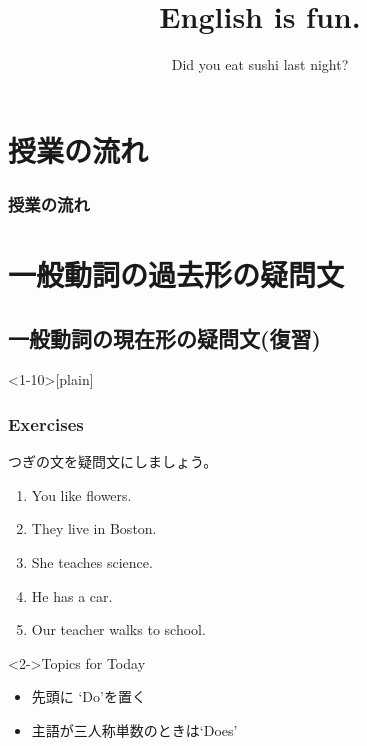 \documentclass[aspectratio=169,xcolor={dvipsnames,table}]{beamer}
\title{English is fun.}
\subtitle{Did you eat sushi last night?}
\author{}
\institute[]{}
\date[]
\newcommand{\myaudio}[1]{\href{#1}{\faVolumeUp}}
\begin{document}
\begin{frame}[plain]
  \titlepage
\end{frame}

\section*{授業の流れ}
\begin{frame}[plain]
  \frametitle{授業の流れ}
  \tableofcontents
\end{frame}

\section{一般動詞の過去形の疑問文}
\subsection{一般動詞の現在形の疑問文(復習)}
 
\begin{frame}<1-10>[plain]\frametitle{Exercises}

つぎの文を疑問文にしましょう。

 \begin{enumerate}
  \item<1-> You like flowers.\hspace{59.7pt}
  \item<1-> They live in Boston.\hspace{47.5pt}%
  \item<1-> She teaches science.\hspace{42pt}%
  \item<1-> He has  a car.\hspace{80.5pt}%
  \item<1-> Our teacher walks to school.
 \end{enumerate}

\begin{exampleblock}<2->{Topics for Today}
\begin{itemize}\small
 \item<3->   先頭に `Do'を置く\pause
 \item<4->   主語が三人称単数のときは`Does'
\end{itemize}
\end{exampleblock}
\vspace{-10pt}
%
 \mbox{}\hfill\myaudio{./audio/027_past_did_you_01.mp3}

\end{frame}
\end{document}
